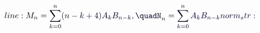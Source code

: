 \documentclass[12pt]{article}
\begin{document}
\makeatletter
\renewcommand*{\@textcolor}[3]{%
  \protect\leavevmode
  \begingroup
    \color#1{#2}#3%
  \endgroup
}
\makeatother
\begin{displaymath}
\mathcolor[RGB]{0,0,15}{line:
M_n=\sum_{k=0}^n} \mathcolor[RGB]{0,0,30}{(n-k+4)A_kB_{n-k},\quadN_n=\sum_{k=0}^n} \mathcolor[RGB]{0,0,45}{A_kB_{n-k}

norm_str:}
\end{displaymath}
\end{document}
